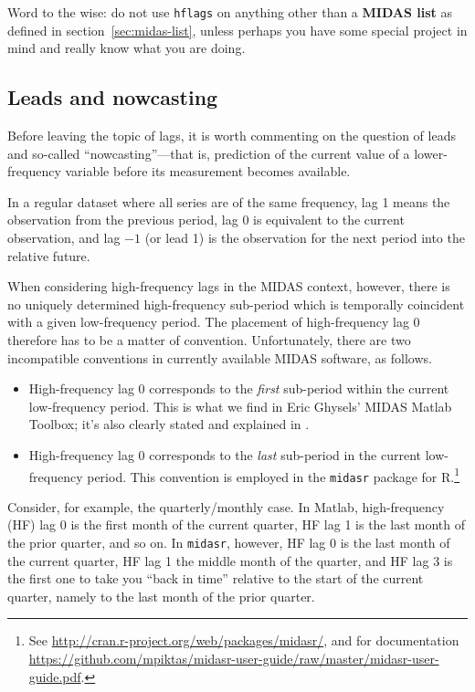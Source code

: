 Word to the wise: do not use \texttt{hflags} on anything other than a
\textbf{MIDAS list} as defined in section~\ref{sec:midas-list}, unless
perhaps you have some special project in mind and really know what you
are doing.

\subsection{Leads and nowcasting}

Before leaving the topic of lags, it is worth commenting on the
question of leads and so-called ``nowcasting''---that is, prediction
of the current value of a lower-frequency variable before its
measurement becomes available.

In a regular dataset where all series are of the same frequency,
lag 1 means the observation from the previous period, lag 0 is
equivalent to the current observation, and lag $-1$ (or lead 1) is the
observation for the next period into the relative future.

When considering high-frequency lags in the MIDAS context, however,
there is no uniquely determined high-frequency sub-period which is
temporally coincident with a given low-frequency period. The placement
of high-frequency lag 0 therefore has to be a matter of
convention. Unfortunately, there are two incompatible conventions in
currently available MIDAS software, as follows.
%
\begin{itemize}
\item High-frequency lag 0 corresponds to the \textit{first}
  sub-period within the current low-frequency period. This is what we
  find in Eric Ghysels' \textsf{MIDAS Matlab Toolbox}; it's also
  clearly stated and explained in \cite{armesto10}.
\item High-frequency lag 0 corresponds to the \textit{last} sub-period
  in the current low-frequency period. This convention is employed in
  the \texttt{midasr} package for \textsf{R}.\footnote{See
    \url{http://cran.r-project.org/web/packages/midasr/}, and for
    documentation
    \url{https://github.com/mpiktas/midasr-user-guide/raw/master/midasr-user-guide.pdf}.}
\end{itemize}
%
Consider, for example, the quarterly/monthly case. In \textsf{Matlab},
high-frequency (HF) lag 0 is the first month of the current quarter,
HF lag 1 is the last month of the prior quarter, and so on. In
\texttt{midasr}, however, HF lag 0 is the last month of the current
quarter, HF lag 1 the middle month of the quarter, and HF lag 3
is the first one to take you ``back in time'' relative to the start
of the current quarter, namely to the last month of the prior
quarter.

